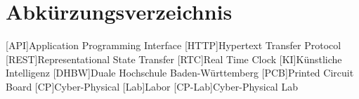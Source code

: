 \chapter*{Abkürzungsverzeichnis}
\begin{acronym}[SBC]                
	[API]{Application Programming Interface}
	[HTTP]{Hypertext Transfer Protocol}
	[REST]{Representational State Transfer}
	[RTC]{Real Time Clock}
	[KI]{Künstliche Intelligenz}
	[DHBW]{Duale Hochschule Baden-Württemberg}
	[PCB]{Printed Circuit Board}
	[CP]{Cyber-Physical}
	[Lab]{Labor}
	[CP-Lab]{Cyber-Physical Lab}
\end{acronym}
